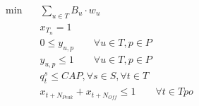 \begin{align}
  \min\quad & \sum_{u \in T} B_u \cdot w_u \tag{eq\_0002} \\
  & x_{T_{n}} = 1 \tag{eq\_0007} \\
  & 0 \le y_{u,p} \qquad \forall u \in T, p \in P \tag{eq\_0008\_a} \\
  & y_{u,p} \le 1 \qquad \forall u \in T, p \in P \tag{eq\_0008\_b} \\
  & q_{t}^{s} \leq \mathit{CAP} , \forall s \in S , \forall t \in T \tag{eq\_0022} \\
  & x_{t+N_{Peak}} + x_{t+N_{Off}} \le 1 \qquad \forall t \in \mathit{Tpo} \tag{eq\_0026} \\
\end{align}
